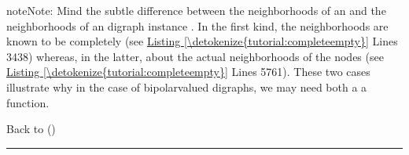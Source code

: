 \documentclass[a4paper,12pt,english]{sphinxhowto}
\begin{document}
\begin{sphinxVerbatim}[commandchars=\\\{\},numbers=left,firstnumber=1,stepnumber=1]
\end{sphinxVerbatim}

\begin{sphinxadmonition}{note}{Note:}
Mind the subtle difference between the neighborhoods of an  and the neighborhoods of an  digraph instance . In the first kind, the neighborhoods are known to be completely   (see \hyperref[\detokenize{tutorial:completeempty}]{Listing \ref{\detokenize{tutorial:completeempty}}} Lines 34\sphinxhyphen{}38) whereas, in the latter,  about the actual neighborhoods of the nodes  (see \hyperref[\detokenize{tutorial:completeempty}]{Listing \ref{\detokenize{tutorial:completeempty}}} Lines 57\sphinxhyphen{}61). These two cases illustrate why in the case of bipolar\sphinxhyphen{}valued digraphs, we may need both a   a  function.
\end{sphinxadmonition}

Back to {\hyperref[\detokenize{tutorial:tutorial-label}]{}} ()


\bigskip\hrule\bigskip
\end{document}
